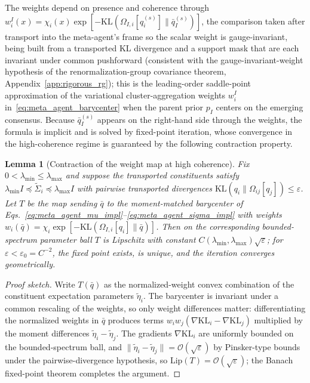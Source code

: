 \documentclass[11pt]{article}
\newtheorem{lemma}{Lemma}
\begin{document}
The weights depend on presence and coherence through $w_i^I(x) = \chi_i(x) \exp[-\mathrm{KL}(\Omega_{I,i}[q_i^{(s)}] \| \bar{q}_I^{(s)})]$, the comparison taken after transport into the meta-agent's frame so the scalar weight is gauge-invariant, being built from a transported KL divergence and a support mask that are each invariant under common pushforward (consistent with the gauge-invariant-weight hypothesis of the renormalization-group covariance theorem, Appendix~\ref{app:rigorous_rg}); this is the leading-order saddle-point approximation of the variational cluster-aggregation weights $w_i^I$ in~\eqref{eq:meta_agent_barycenter} when the parent prior $p_I$ centers on the emerging consensus. Because $\bar{q}_I^{(s)}$ appears on the right-hand side through the weights, the formula is implicit and is solved by fixed-point iteration, whose convergence in the high-coherence regime is guaranteed by the following contraction property.

\begin{lemma}[Contraction of the weight map at high coherence]
\label{lem:weight_contraction}
Fix $0 < \lambda_{\min} \le \lambda_{\max}$ and suppose the transported constituents satisfy $\lambda_{\min} I \preceq \tilde{\Sigma}_i \preceq \lambda_{\max} I$ with pairwise transported divergences $\mathrm{KL}(q_i \| \Omega_{ij}[q_j]) \le \varepsilon$. Let $T$ be the map sending $\bar{q}$ to the moment-matched barycenter of Eqs.~\eqref{eq:meta_agent_mu_impl}--\eqref{eq:meta_agent_sigma_impl} with weights $w_i(\bar{q}) = \chi_i \exp[-\mathrm{KL}(\Omega_{I,i}[q_i] \| \bar{q})]$. Then on the corresponding bounded-spectrum parameter ball $T$ is Lipschitz with constant $C(\lambda_{\min}, \lambda_{\max})\sqrt{\varepsilon}$; for $\varepsilon < \varepsilon_0 = C^{-2}$, the fixed point exists, is unique, and the iteration converges geometrically.
\end{lemma}

\begin{proof}[Proof sketch]
Write $T(\bar{q})$ as the normalized-weight convex combination of the constituent expectation parameters $\tilde{\eta}_i$. The barycenter is invariant under a common rescaling of the weights, so only weight differences matter: differentiating the normalized weights in $\bar{q}$ produces terms $w_i w_j(\nabla\mathrm{KL}_i - \nabla\mathrm{KL}_j)$ multiplied by the moment differences $\tilde{\eta}_i - \tilde{\eta}_j$. The gradients $\nabla\mathrm{KL}_i$ are uniformly bounded on the bounded-spectrum ball, and $\|\tilde{\eta}_i - \tilde{\eta}_j\| = \mathcal{O}(\sqrt{\varepsilon})$ by Pinsker-type bounds under the pairwise-divergence hypothesis, so $\mathrm{Lip}(T) = \mathcal{O}(\sqrt{\varepsilon})$; the Banach fixed-point theorem completes the argument.
\end{proof}
\end{document}
